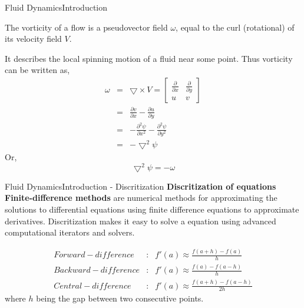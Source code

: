 \documentclass[11pt]{beamer}
\begin{document}
\begin{frame}{Fluid Dynamics}{Introduction}

The vorticity of a flow is a pseudovector field $\omega$, equal to the curl (rotational) of its velocity field $V$.

It describes the local spinning motion of a fluid near some point.
Thus vorticity can be written as,
\begin{eqnarray}
\omega &=& \bigtriangledown \times V 
= \begin{bmatrix}
\frac{\partial}{\partial x} & \frac{\partial}{\partial y} \\
u & v 
\end{bmatrix} \nonumber\\
&=& \frac{\partial v}{\partial x} - \frac{\partial u}{\partial y} \nonumber\\
&=& - \frac{\partial^{2} \psi}{\partial x^{2}} - \frac{\partial^{2} \psi}{\partial y^{2}} \nonumber\\
&=& - \bigtriangledown ^{2} \psi \nonumber
\end{eqnarray}
Or,
\begin{equation}
\bigtriangledown ^{2} \psi = -\omega
\end{equation}
\end{frame}


\begin{frame}{Fluid Dynamics}{Introduction - Discritization}
\textbf{Discritization of equations}
\linebreak
\linebreak
\textbf{Finite-difference methods} are numerical methods for approximating the solutions to differential equations using finite difference equations to approximate derivatives. \linebreak
Discritization makes it easy to solve a equation using advanced computational iterators and solvers.

\begin{eqnarray} \label{eqn2} \nonumber
Forward-difference &:& f'(a) \approx \frac{f(a+h)-f(a)}{h} \nonumber\\
Backward-difference &:& f'(a) \approx \frac{f(a)-f(a-h)}{h}  \nonumber\\
Central-difference &:&  f'(a) \approx \frac{f(a+h)-f(a-h)}{2h} \nonumber
\end{eqnarray}
where $h$ being the gap between two consecutive points.
\end{frame}
\end{document}

